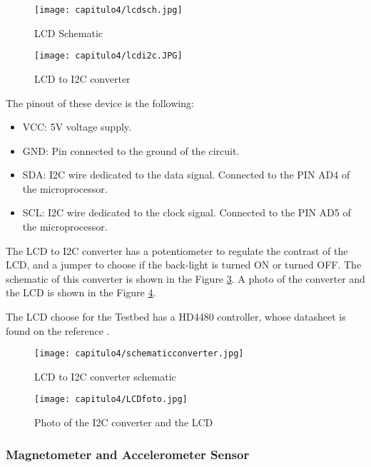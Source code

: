   
\begin{figure}[H]
	\centering
		\texttt{[image: capitulo4/lcdsch.jpg]}
	\caption{LCD Schematic}
	\label{fig:LCDsch}
\end{figure}

  
\begin{figure}[H]
	\centering
		\texttt{[image: capitulo4/lcdi2c.JPG]}
	\caption{LCD to I2C converter}
	\label{fig:lcdi2c}
\end{figure}

The pinout of these device is the following:
\begin{itemize}
\item VCC: 5V voltage supply.
\item GND: Pin connected to the ground of the circuit. 
\item SDA: I2C wire dedicated to the data signal. Connected to the PIN AD4 of the microprocessor.
\item SCL: I2C wire dedicated to the clock signal. Connected to the PIN AD5 of the microprocessor.
\end{itemize}

The LCD to I2C converter has a potentiometer to regulate the contrast of the LCD, and a jumper to choose if the back-light is turned ON or turned OFF. The schematic of this converter is shown in the Figure \ref{fig:schematicconverter}. A photo of the converter and the LCD is shown in the Figure \ref{fig:LCDphoto}.

The LCD choose for the Testbed has a HD4480 controller, whose datasheet is found on the reference \cite{HD4480}.


  
\begin{figure}[H]
	\centering
		\texttt{[image: capitulo4/schematicconverter.jpg]}
	\caption{LCD to I2C converter schematic \cite{LCDschematic}}
	\label{fig:schematicconverter}
\end{figure}

  
\begin{figure}[H]
	\centering
		\texttt{[image: capitulo4/LCDfoto.jpg]}
	\caption{Photo of the I2C converter and the LCD \cite{LCDphotoref}}
	\label{fig:LCDphoto}
\end{figure}

\subsubsection{Magnetometer and Accelerometer Sensor} \label{sssec:MagAc}

